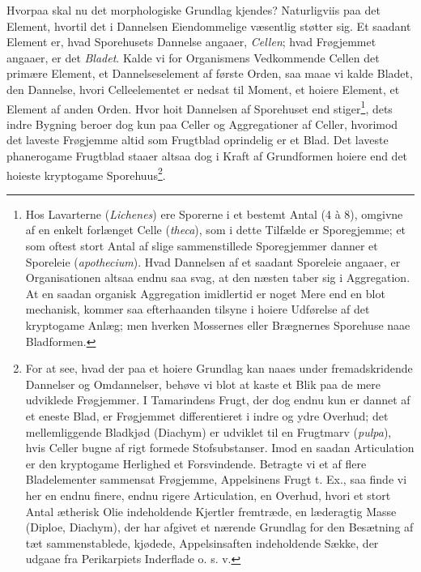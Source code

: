 \documentclass[11pt]{book}
\newcommand{\opage}[1]{\marginnote{\footnotesize\textit{[#1]}}}
\begin{document}
Hvorpaa skal nu det morphologiske Grundlag kjendes? Naturligviis paa det
Element, hvortil det i Dannelsen Eiendommelige væsentlig støtter sig. Et
saadant Element er, hvad Sporehusets Dannelse angaaer, \emph{Cellen};
hvad Frøgjemmet angaaer, er det \emph{Bladet}. Kalde vi for Organismens
Vedkommende Cellen det primære Element, et Dannelseselement af første
Orden, saa maae vi kalde Bladet, den Dannelse, hvori Celleelementet er
nedsat til Moment, et hoiere Element, et Element af anden Orden. Hvor
hoit Dannelsen af Sporehuset end stiger\footnote{%
Hos Lavarterne (\textit{Lichenes}) ere Sporerne i et bestemt Antal
(4 à 8), omgivne af en enkelt forlænget Celle (\textit{theca}), som i
dette Tilfælde er Sporegjemme; et som oftest stort Antal af slige
sammenstillede Sporegjemmer danner et Sporeleie
(\textit{apothecium}). Hvad Dannelsen af et saadant Sporeleie angaaer,
er Organisationen altsaa endnu saa svag, at den næsten taber sig i
Aggregation. At en saadan organisk Aggregation imidlertid er noget Mere
end en blot mechanisk, kommer saa efterhaanden tilsyne i hoiere
Udførelse
af det kryptogame Anlæg; men hverken Mossernes eller Brægnernes
Sporehuse naae Bladformen.
}, dets indre Bygning beroer dog kun paa
\opage{295} \setcounter{footnote}{0}%
Celler og Aggregationer af Celler, hvorimod det laveste Frøgjemme altid
som Frugtblad oprindelig er et Blad. Det laveste phanerogame Frugtblad
staaer altsaa dog i Kraft af Grundformen hoiere end det hoieste
kryptogame Sporehuus\footnote{%
For at see, hvad der paa et hoiere Grundlag kan naaes under
fremadskridende Dannelser og Omdannelser, behøve vi blot at kaste et
Blik paa de mere udviklede Frøgjemmer. I Tamarindens Frugt, der dog
endnu kun er dannet af et eneste Blad, er Frøgjemmet differentieret i
indre og ydre Overhud; det mellemliggende Bladkjød (Diachym) er udviklet
til en Frugtmarv (\textit{pulpa}), hvis Celler bugne af rigt formede
Stofsubstanser. Imod en saadan Articulation er den kryptogame Herlighed
et Forsvindende. Betragte vi et af flere Bladelementer sammensat
Frøgjemme, Appelsinens Frugt t. Ex., saa finde vi her en endnu finere,
endnu rigere Articulation, en Overhud, hvori et stort Antal ætherisk
Olie indeholdende Kjertler fremtræde, en læderagtig Masse (Diploe,
Diachym), der har afgivet
et nærende Grundlag for den Besætning af tæt sammenstablede, kjødede,
Appelsinsaften indeholdende Sække, der udgaae fra Perikarpiets
Inderflade o. s. v.
}.
\end{document}
